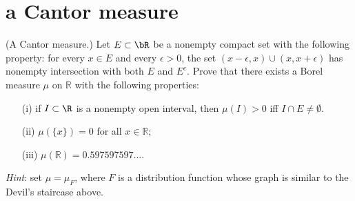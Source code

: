 \documentclass[lang=cn,11pt]{elegantbook}
\begin{document}
\section{a Cantor measure}
  (A Cantor measure.)
  Let $E\subset\bR$ be a nonempty compact set with the following property: for every $x\in E$ and every $\epsilon>0$, the set $(x-\epsilon,x)\cup(x,x+\epsilon)$ has nonempty intersection with both $E$ and $E^c$. Prove that there exists a Borel measure $\mu$ on $\mathbb{R}$ with the following properties:
  \begin{itemize}
  \item[(i)]
    if $I\subset\R$ is a nonempty open interval, then $\mu(I)>0$ iff $I\cap E\ne\emptyset$.
  \item[(ii)]
    $\mu(\{x\})=0$ for all $x\in\mathbb{R}$; 
  \item[(iii)]
    $\mu(\mathbb{R})=0.597597597\dots$.
  \end{itemize}
  \textit{Hint}: set $\mu=\mu_F$, where $F$ is a distribution function whose graph is similar to the Devil's staircase above.
 
\end{document}
